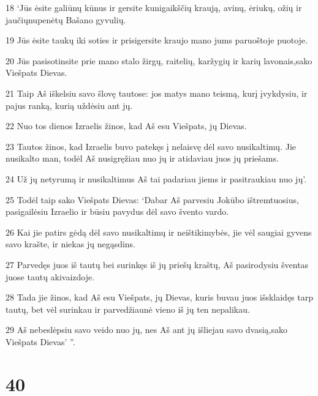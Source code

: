 \par 18 ‘Jūs ėsite galiūnų kūnus ir gersite kunigaikščių kraują, avinų, ėriukų, ožių ir jaučių­nupenėtų Bašano gyvulių. 
\par 19 Jūs ėsite taukų iki soties ir prisigersite kraujo mano jums paruoštoje puotoje. 
\par 20 Jūs pasisotinsite prie mano stalo žirgų, raitelių, karžygių ir karių lavonais,­sako Viešpats Dievas.­ 
\par 21 Taip Aš iškelsiu savo šlovę tautose: jos matys mano teismą, kurį įvykdysiu, ir pajus ranką, kurią uždėsiu ant jų. 
\par 22 Nuo tos dienos Izraelis žinos, kad Aš esu Viešpats, jų Dievas. 
\par 23 Tautos žinos, kad Izraelis buvo patekęs į nelaisvę dėl savo nusikaltimų. Jie nusikalto man, todėl Aš nusigręžiau nuo jų ir atidaviau juos jų priešams. 
\par 24 Už jų netyrumą ir nusikaltimus Aš tai padariau jiems ir pasitraukiau nuo jų’. 
\par 25 Todėl taip sako Viešpats Dievas: ‘Dabar Aš parvesiu Jokūbo ištremtuosius, pasigailėsiu Izraelio ir būsiu pavydus dėl savo švento vardo. 
\par 26 Kai jie patirs gėdą dėl savo nusikaltimų ir neištikimybės, jie vėl saugiai gyvens savo krašte, ir niekas jų negąsdins. 
\par 27 Parvedęs juos iš tautų bei surinkęs iš jų priešų kraštų, Aš pasirodysiu šventas juose tautų akivaizdoje. 
\par 28 Tada jie žinos, kad Aš esu Viešpats, jų Dievas, kuris buvau juos išsklaidęs tarp tautų, bet vėl surinkau ir parvedžiau­nė vieno iš jų ten nepalikau. 
\par 29 Aš nebeslėpsiu savo veido nuo jų, nes Aš ant jų išliejau savo dvasią,­sako Viešpats Dievas’ ”.



\chapter{40}


